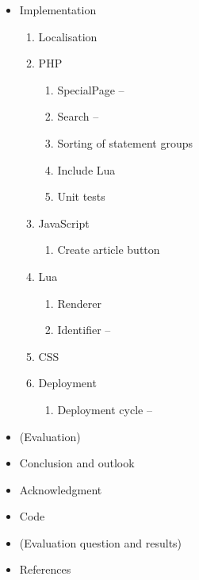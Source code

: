 \documentclass[11pt]{article}
\begin{document}
  \begin{itemize}
  \item Implementation
  \begin{enumerate}
   \item Localisation
   \item PHP
   \begin{enumerate}
    \item SpecialPage --
    \item Search --
    \item Sorting of statement groups
    \item Include Lua
    \item Unit tests
   \end{enumerate}
   \item JavaScript
   \begin{enumerate}
    \item Create article button
   \end{enumerate}
   \item Lua
   \begin{enumerate}
    \item Renderer
    \item Identifier --
   \end{enumerate}
   \item CSS
   \item Deployment
   \begin{enumerate}
    \item Deployment cycle --
   \end{enumerate}
  \end{enumerate}
  \item (Evaluation)
  \item Conclusion and outlook
  \item Acknowledgment
  \item Code
  \item (Evaluation question and results)
  \item References
\end{itemize}
\end{document}

